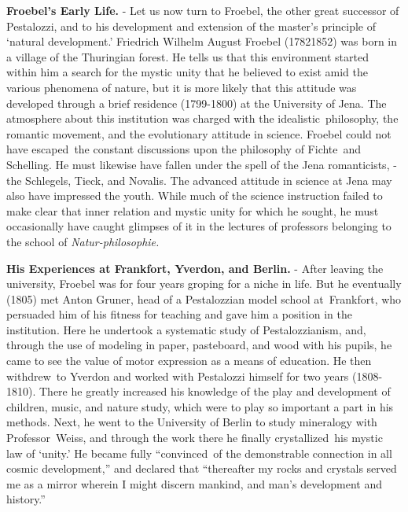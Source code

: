 \documentclass[
]{book}
\begin{document}
\textbf{Froebel's Early Life.} - Let us now turn to Froebel, the other great successor of Pestalozzi, and to his development and extension of the master's principle of `natural development.' Friedrich Wilhelm August Froebel (17821852) was born in a village of the Thuringian forest. He tells us that this environment started within him a search for the mystic unity that he believed to exist amid the various phenomena of nature, but it is more likely that this attitude was developed through a brief residence (1799-1800) at the University of Jena. The atmosphere about this institution was charged with the idealistic~philosophy, the romantic movement, and the evolutionary attitude in science. Froebel could not have escaped~the constant discussions upon the philosophy of Fichte~and Schelling. He must likewise have fallen under the spell of the Jena romanticists, - the Schlegels, Tieck, and Novalis. The advanced attitude in science at Jena may also have impressed the youth. While much of the science instruction failed to make clear that inner relation and mystic unity for which he sought, he must occasionally have caught glimpses of it in the lectures of professors belonging to the school of \emph{Natur-philosophie.}

\textbf{His Experiences at Frankfort, Yverdon, and Berlin.} - After leaving the university, Froebel was for four years groping for a niche in life. But he eventually (1805) met Anton Gruner, head of a Pestalozzian model school at~Frankfort, who persuaded him of his fitness for teaching and gave him a position in the institution. Here he undertook a systematic study of Pestalozzianism, and, through the use of modeling in paper, pasteboard, and wood with his pupils, he came to see the value of motor expression as a means of education. He then withdrew~to Yverdon and worked with Pestalozzi himself for two years (1808-1810). There he greatly increased his knowledge of the play and development of children, music, and nature study, which were to play so important a part in his methods. Next, he went to the University of Berlin to study mineralogy with Professor~Weiss, and through the work there he finally crystallized~his mystic law of `unity.' He became fully ``convinced~of the demonstrable connection in all cosmic development,'' and declared that ``thereafter my rocks and crystals served me as a mirror wherein I might discern mankind, and man's development and history.''
\end{document}
